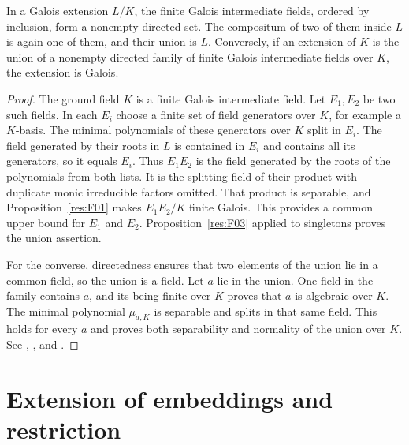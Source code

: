 \begin{theorem}
\label{res:F04}
In a Galois extension \(L/K\), the finite Galois intermediate fields,
ordered by inclusion, form a nonempty directed set. The compositum of
two of them inside \(L\) is again one of them, and their union is \(L\).
Conversely, if an extension of \(K\) is the union of a nonempty directed
family of finite Galois intermediate fields over \(K\), the extension
is Galois.
\end{theorem}
\begin{proof}
The ground field \(K\) is a finite Galois intermediate field.
Let \(E_1,E_2\) be two such fields. In each \(E_i\) choose a finite
set of field generators over \(K\), for example a \(K\)-basis.
The minimal polynomials of these generators over \(K\) split in
\(E_i\). The field generated by their roots in \(L\) is contained
in \(E_i\) and contains all its generators, so it equals \(E_i\).
Thus \(E_1E_2\) is the field generated by the roots of the polynomials
from both lists. It is the splitting field of their product with
duplicate monic irreducible factors omitted. That product is
separable, and Proposition~\ref{res:F01} makes \(E_1E_2/K\) finite
Galois. This provides a common upper bound for \(E_1\) and \(E_2\).
Proposition~\ref{res:F03} applied to singletons proves the union
assertion.

For the converse, directedness ensures that two elements of the
union lie in a common field, so the union is a field. Let \(a\)
lie in the union. One field in the family contains \(a\), and
its being finite over \(K\) proves that
\(a\) is algebraic over \(K\). The minimal polynomial \(\mu_{a,K}\)
is separable and splits in that same field. This holds for every
\(a\) and proves both separability and normality of the union over
\(K\). See \cite[Proposition 3.21, Chapter 7, and Example 7.26]{milne},
\cite[Theorem 2.11.1]{rz}, and \cite[Tag 0BU2]{stacks}.
\end{proof}

\section{Extension of embeddings and restriction}

